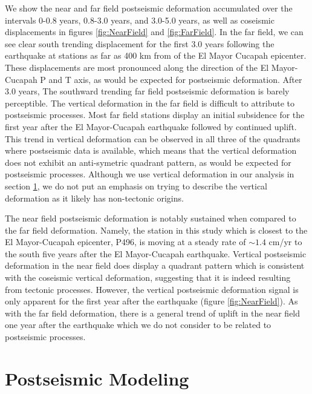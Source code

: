 \documentclass[1p]{elsarticle}
\begin{document}
We show the near and far field postseismic deformation accumulated over the intervals  0-0.8 years, 0.8-3.0 years, and 3.0-5.0 years, as well as coseismic displacements in figures \ref{fig:NearField} and \ref{fig:FarField}.  In the far field, we can see clear south trending displacement for the first 3.0 years following the earthquake at stations as far as 400 km from of the El Mayor Cucapah epicenter.  These displacements are most pronounced along the direction of the El Mayor-Cucapah P and T axis, as would be expected for postseismic deformation. After 3.0 years, The southward trending far field postseismic deformation is barely perceptible.  The vertical deformation in the far field is difficult to attribute to postseismic processes.  Most far field stations display an initial subsidence for the first year after the El Mayor-Cucapah earthquake followed by continued uplift.  This trend in vertical deformation can be observed in all three of the quadrants where postseismic data is available, which means that the vertical deformation does not exhibit an anti-symetric quadrant pattern, as would be expected for postseismic processes.  Although we use vertical deformation in our analysis in section \ref{sec:Model},  we do not put an emphasis on trying to describe the vertical deformation as it likely has non-tectonic origins.        

The near field postseismic deformation is notably sustained when compared to the far field deformation.  Namely, the station in this study which is closest to the El Mayor-Cucapah epicenter, P496, is moving at a steady rate of $\sim1.4$ cm/yr to the south five years after the El Mayor-Cucapah earthquake.  Vertical postseismic deformation in the near field does display a quadrant pattern which is consistent with the coseismic vertical deformation, suggesting that it is indeed resulting from tectonic processes.  However, the vertical postseismic deformation signal is only apparent for the first year after the earthquake (figure \ref{fig:NearField}).  As with the far field deformation, there is a general trend of uplift in the near field one year after the earthquake which we do not consider to be related to postseismic processes.  

\section{Postseismic Modeling}\label{sec:Model}
\end{document}
